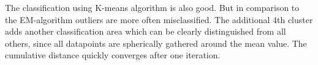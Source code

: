 \documentclass{article}
\begin{document}
The classification using K-means algorithm is also good. But in comparison to the EM-algorithm outliers are more often misclassified. The additional 4th cluster adds another classification area which can be clearly distinguished from all others, since all datapoints are spherically gathered around the mean value.
The cumulative distance quickly converges after one iteration. 
 
\begin{figure}[!ht]
\end{figure}
\end{document}
